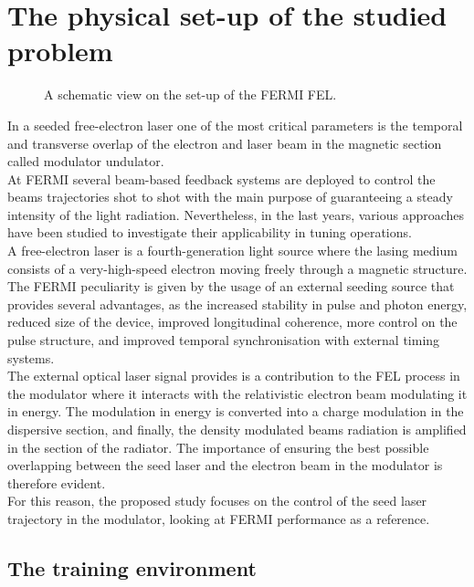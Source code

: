 \documentclass[
reprint,
amsmath,amssymb,amsfonts,clevref,
aps,
prstab,
]{revtex4-2}
\begin{document}
	
	\section{The physical set-up of the studied problem}
	\begin{figure}[!h]
		\centering
		
		\caption{A schematic view on the set-up of the FERMI FEL.}
		\label{fig:schematic_FEL}
	\end{figure}
	In a seeded free-electron laser one of the most critical parameters is the temporal and transverse overlap of the electron and laser beam in the magnetic section called modulator undulator.\\
	At FERMI several beam-based feedback systems are deployed to control the beams trajectories shot to shot with the main purpose of guaranteeing a steady intensity of the light radiation. Nevertheless, in the last years, various approaches have been studied to investigate their applicability in tuning operations. \\
	A free-electron laser is a fourth-generation light source where the lasing medium consists of a very-high-speed electron moving freely through a magnetic structure. The FERMI peculiarity is given by the usage of an external seeding source that provides several advantages, as the increased stability in pulse and photon energy, reduced size of the device, improved longitudinal coherence, more control on the pulse structure, and improved temporal synchronisation with external timing systems.\\
	The external optical laser signal provides is a contribution to the FEL process in the modulator where it interacts with the relativistic electron beam modulating it in energy. The modulation in energy is converted into a charge modulation in the dispersive section, and finally, the density modulated beams radiation is amplified in the section of the radiator. The importance of ensuring the best possible overlapping between the seed laser and the electron beam in the modulator is therefore evident.\\
	For this reason, the proposed study focuses on the control of the seed laser trajectory in the modulator, looking at FERMI performance as a reference.
	
	
	\subsection{The training environment}
	
\end{document}
